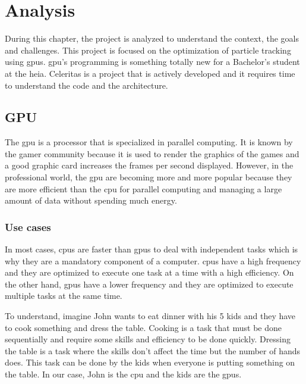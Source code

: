 \chapter{Analysis}
\label{ch:analyze}

During this chapter, the project is analyzed to understand the context, the
goals and challenges.
This project is focused on the optimization of particle tracking using
\acrshort{gpu}s.
\acrshort{gpu}'s programming is something totally new for a Bachelor's
student at the \acrshort{heia}.
Celeritas is a project that is actively developed and it requires time to
understand the code and the architecture.


\section{GPU}
\label{ch:analyze:gpu}

The \acrfull{gpu} is a processor that is specialized in parallel computing.
It is known by the gamer community because it is used to render the graphics of
the games and a good graphic card increases the frames per second displayed.
However, in the professional world, the \acrshort{gpu} are becoming more and
more popular because they are more efficient than the \acrshort{cpu} for
parallel computing and managing a large amount of data without spending much
energy.


\subsection{Use cases}
\label{ch:analyze:gpu:use-cases}

In most cases, \acrshort{cpu}s are faster than \acrshort{gpu}s to deal with
independent tasks which is why they are a mandatory component of a computer.
\acrshort{cpu}s have a high frequency and they are optimized to execute one
task at a time with a high efficiency.
On the other hand, \acrshort{gpu}s have a lower frequency and they are optimized
to execute multiple tasks at the same time.

To understand, imagine John wants to eat dinner with his 5 kids and they have to
cook something and dress the table.
Cooking is a task that must be done sequentially and require some skills and
efficiency to be done quickly.
Dressing the table is a task where the skills don't affect the time but the
number of hands does.
This task can be done by the kids when everyone is putting something on the table.
In our case, John is the \acrshort{cpu} and the kids are the \acrshort{gpu}s.

